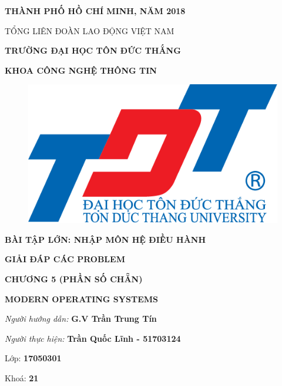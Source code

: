 \documentclass{report}
\begin{document}
\vspace{1cm}
\changefontsizes{14pt}
\centerline{\textbf{THÀNH PHỐ HỒ CHÍ MINH, NĂM 2018}}


\newpage
\changefontsizes[14pt]{12pt}
\centerline{TỔNG LIÊN ĐOÀN LAO ĐỘNG VIỆT NAM}

\changefontsizes[14pt]{11pt}
\centerline{\textbf{TRƯỜNG ĐẠI HỌC TÔN ĐỨC THẮNG}}
\centerline{\textbf{KHOA CÔNG NGHỆ THÔNG TIN}}

\begin{center}
    \begin{figure}[htp]
    \begin{center}
     \includegraphics[scale=.2]{logo}
    \end{center}
    \end{figure}
\end{center}

\changefontsizes{16pt}
\centerline{\textbf{BÀI TẬP LỚN: NHẬP MÔN HỆ ĐIỀU HÀNH}}
\vspace{1.5cm}
\changefontsizes{24pt}
\centerline{\textbf{GIẢI ĐÁP CÁC PROBLEM}}
\centerline{\textbf{CHƯƠNG 5 (PHẦN SỐ CHẴN)}}
\centerline{\textbf{MODERN OPERATING SYSTEMS}}

\vspace{4cm}
\begin{flushright}
\renewcommand{\baselinestretch}{0.05}
\changefontsizes{14pt}
\textit{Người hướng dẫn: }\textbf{G.V Trần Trung Tín}
\setlength{\parskip}{0.5em}

\textit{Người thực hiện: }\textbf{Trần Quốc Lĩnh - 51703124}
\setlength{\parskip}{0.5em}

Lớp: \textbf{17050301}
\setlength{\parskip}{0.5em}

Khoá: \textbf{21}
\setlength{\parskip}{0.5em}

\end{flushright}
\end{document}

